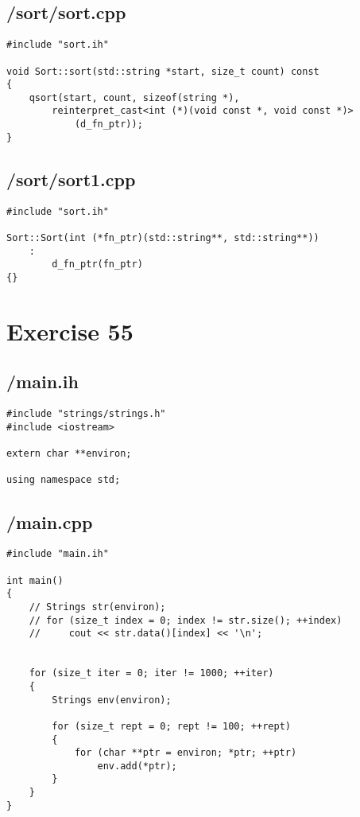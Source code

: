 \documentclass{article}
\begin{document}
\subsection*{/sort/sort.cpp}
\begin{verbatim}
#include "sort.ih"

void Sort::sort(std::string *start, size_t count) const
{   
    qsort(start, count, sizeof(string *), 
        reinterpret_cast<int (*)(void const *, void const *)>
            (d_fn_ptr));
}
\end{verbatim}
\subsection*{/sort/sort1.cpp}
\begin{verbatim}
#include "sort.ih"

Sort::Sort(int (*fn_ptr)(std::string**, std::string**))
    :
        d_fn_ptr(fn_ptr)
{}

\end{verbatim}


\section*{Exercise 55}
\subsection*{/main.ih}
\begin{verbatim}
#include "strings/strings.h"
#include <iostream>

extern char **environ;

using namespace std;

\end{verbatim}
\subsection*{/main.cpp}
\begin{verbatim}
#include "main.ih"

int main()
{
    // Strings str(environ);
    // for (size_t index = 0; index != str.size(); ++index)
    //     cout << str.data()[index] << '\n';
    

    for (size_t iter = 0; iter != 1000; ++iter)
    {
        Strings env(environ);

        for (size_t rept = 0; rept != 100; ++rept)
        {
            for (char **ptr = environ; *ptr; ++ptr)
                env.add(*ptr);
        }
    } 
}
\end{verbatim}
\end{document}
